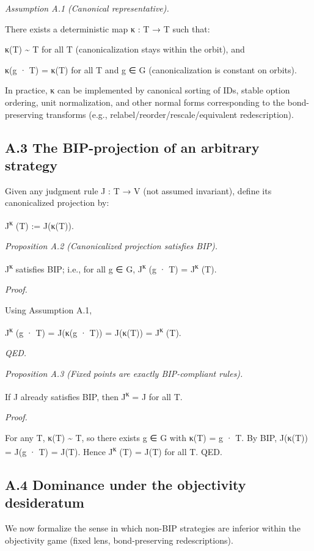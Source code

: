 \documentclass[12pt]{article}
\theoremstyle{plain}
\theoremstyle{definition}
\theoremstyle{remark}
\begin{document}
\emph{Assumption A.1 (Canonical representative).}

There exists a deterministic map κ : T → T such that:

κ(T) \textasciitilde{} T for all T (canonicalization stays within the
orbit), and

κ(g · T) = κ(T) for all T and g ∈ G (canonicalization is constant on
orbits).

In practice, κ can be implemented by canonical sorting of IDs, stable
option ordering, unit normalization, and other normal forms
corresponding to the bond-preserving transforms (e.g.,
relabel/reorder/rescale/equivalent redescription).

\subsection{A.3 The BIP-projection of an arbitrary
strategy}\label{a.3-the-bip-projection-of-an-arbitrary-strategy}

Given any judgment rule J : T → V (not assumed invariant), define its
canonicalized projection by:

J\textsuperscript{κ} (T) := J(κ(T)).

\emph{Proposition A.2 (Canonicalized projection satisfies BIP).}

J\textsuperscript{κ} satisfies BIP; i.e., for all g ∈ G,
J\textsuperscript{κ} (g · T) = J\textsuperscript{κ} (T).

\emph{Proof.}

Using Assumption A.1,

J\textsuperscript{κ} (g · T) = J(κ(g · T)) = J(κ(T)) =
J\textsuperscript{κ} (T).

\emph{QED.}

\emph{Proposition A.3 (Fixed points are exactly BIP-compliant rules).}

If J already satisfies BIP, then J\textsuperscript{κ} = J for all T.

\emph{Proof.}

For any T, κ(T) \textasciitilde{} T, so there exists g ∈ G with κ(T) = g
· T. By BIP, J(κ(T)) = J(g · T) = J(T). Hence J\textsuperscript{κ} (T) =
J(T) for all T. QED.

\subsection{A.4 Dominance under the objectivity
desideratum}\label{a.4-dominance-under-the-objectivity-desideratum}

We now formalize the sense in which non-BIP strategies are inferior
within the objectivity game (fixed lens, bond-preserving
redescriptions).
\end{document}
